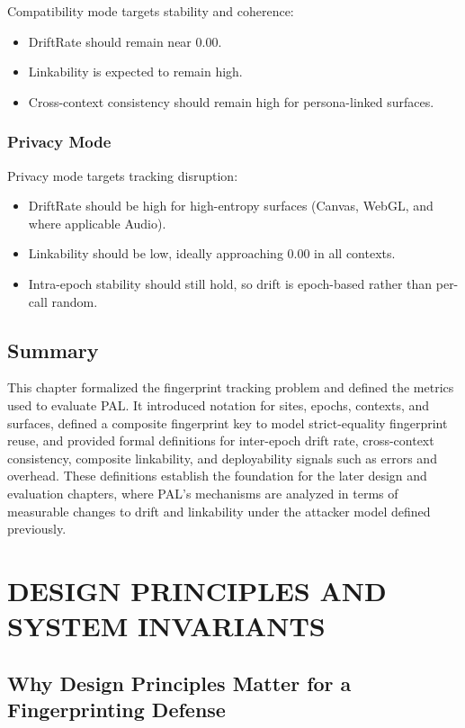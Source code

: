 \documentclass[11pt]{report}
\begin{document}
Compatibility mode targets stability and coherence:
\begin{itemize}
    \item DriftRate should remain near 0.00.
    \item Linkability is expected to remain high.
    \item Cross-context consistency should remain high for persona-linked surfaces.
\end{itemize}

\subsection{Privacy Mode}

Privacy mode targets tracking disruption:
\begin{itemize}
    \item DriftRate should be high for high-entropy surfaces (Canvas, WebGL, and where applicable Audio).
    \item Linkability should be low, ideally approaching 0.00 in all contexts.
    \item Intra-epoch stability should still hold, so drift is epoch-based rather than per-call random.
\end{itemize}

\section{Summary}

This chapter formalized the fingerprint tracking problem and defined the metrics used to evaluate PAL. It introduced notation for sites, epochs, contexts, and surfaces, defined a composite fingerprint key to model strict-equality fingerprint reuse, and provided formal definitions for inter-epoch drift rate, cross-context consistency, composite linkability, and deployability signals such as errors and overhead. These definitions establish the foundation for the later design and evaluation chapters, where PAL's mechanisms are analyzed in terms of measurable changes to drift and linkability under the attacker model defined previously.






\chapter{DESIGN PRINCIPLES AND SYSTEM INVARIANTS}

\section{Why Design Principles Matter for a Fingerprinting Defense}
\end{document}
